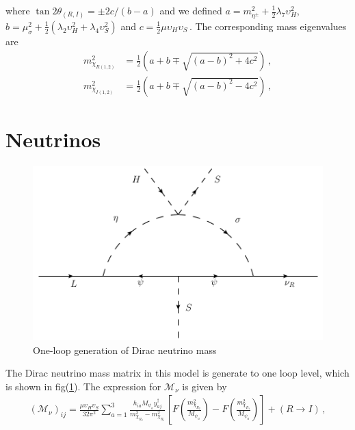 \documentclass[12pt]{article}
\begin{document}
%
where $\tan2\theta_{(R,I)} = \pm2c/(b-a)$ and we defined $a = m^{2}_{\eta^{\pm}} + \frac{1}{2}\lambda_{7} \upsilon^{2}_{H}$, $b = \mu^{2}_{\sigma}+\frac{1}{2}(\lambda_{2} \upsilon^{2}_{H} + \lambda_{4} \upsilon^{2}_{S})$ and $c = \frac{1}{2}\mu \upsilon_{H} \upsilon_{S}$\,. The corresponding mass eigenvalues are
\begin{align*}
    m_{\chi_{R(1,2)}}^{2} &= \frac{1}{2} \left(a + b \mp \sqrt{(a-b)^{2} + 4c^{2}} \right)\,, \\
     m_{\chi_{I(1,2)}}^{2} &= \frac{1}{2} \left(a + b \mp \sqrt{(a-b)^{2} - 4c^{2}} \right)\,,
\end{align*}

\section{Neutrinos}
\label{sec:Neutrinos}
%
\begin{figure}
\centering
\includegraphics[scale=0.75]{Neutrino_Loop.pdf}
\caption{One-loop generation of Dirac neutrino mass}
\label{fig:zee}
\end{figure}
%
 The Dirac neutrino mass matrix in this model is generate to one loop level, which is shown in fig(\ref{fig:zee}). The expression for $\mathcal{M}_{\nu}$ is given by~\cite{Reig:2018mdk}
%
\begin{align}
(\mathcal{M}_{\nu})_{ij} = \frac{\mu \upsilon_{H} \upsilon_{S}}{32 \pi^{2}} \sum_{a=1}^{3} \frac{h_{i a} M_{\psi_{a}}y^{\dagger}_{a j}} {m_{\chi_{R_2}}^{2}-m_{\chi_{R_1}}^{2}} \left[ F\left( \frac{m_{\chi_{R_2}}^{2}}{M_{\psi_{a}}} \right) - F\left( \frac{m_{\chi_{R_1}}^{2}}{M_{\psi_{a}}} \right) \right] + (R \to I)\,,
\end{align}
%
\end{document}
